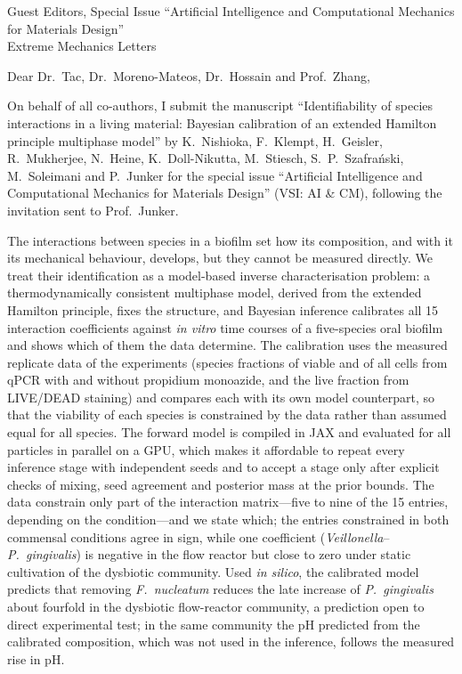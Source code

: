 \documentclass[11pt,a4paper]{letter}
\date{30 October 2026}
\begin{document}
\begin{letter}{Guest Editors, Special Issue ``Artificial Intelligence and Computational Mechanics for Materials Design''\\
Extreme Mechanics Letters}

\opening{Dear Dr.~Tac, Dr.~Moreno-Mateos, Dr.~Hossain and Prof.~Zhang,}

On behalf of all co-authors, I submit the manuscript
``Identifiability of species interactions in a living material: Bayesian calibration of an extended Hamilton principle multiphase model''
by K.~Nishioka, F.~Klempt, H.~Geisler, R.~Mukherjee, N.~Heine, K.~Doll-Nikutta, M.~Stiesch, S.~P.~Szafra\'{n}ski, M.~Soleimani and P.~Junker
for the special issue ``Artificial Intelligence and Computational Mechanics for Materials Design'' (VSI: AI \& CM), following the invitation sent to Prof.~Junker.

The interactions between species in a biofilm set how its composition, and with it its mechanical behaviour, develops, but they cannot be measured directly.
We treat their identification as a model-based inverse characterisation problem: a thermodynamically consistent multiphase model, derived from the extended Hamilton principle, fixes the structure, and Bayesian inference calibrates all 15 interaction coefficients against \textit{in vitro} time courses of a five-species oral biofilm and shows which of them the data determine.
The calibration uses the measured replicate data of the experiments (species fractions of viable and of all cells from qPCR with and without propidium monoazide, and the live fraction from LIVE/DEAD staining) and compares each with its own model counterpart, so that the viability of each species is constrained by the data rather than assumed equal for all species.
The forward model is compiled in JAX and evaluated for all particles in parallel on a GPU, which makes it affordable to repeat every inference stage with independent seeds and to accept a stage only after explicit checks of mixing, seed agreement and posterior mass at the prior bounds.
The data constrain only part of the interaction matrix---five to nine of the 15 entries, depending on the condition---and we state which; the entries constrained in both commensal conditions agree in sign, while one coefficient (\textit{Veillonella}--\textit{P.~gingivalis}) is negative in the flow reactor but close to zero under static cultivation of the dysbiotic community.
Used \textit{in silico}, the calibrated model predicts that removing \textit{F.~nucleatum} reduces the late increase of \textit{P.~gingivalis} about fourfold in the dysbiotic flow-reactor community, a prediction open to direct experimental test; in the same community the pH predicted from the calibrated composition, which was not used in the inference, follows the measured rise in pH.


\end{letter}
\end{document}
